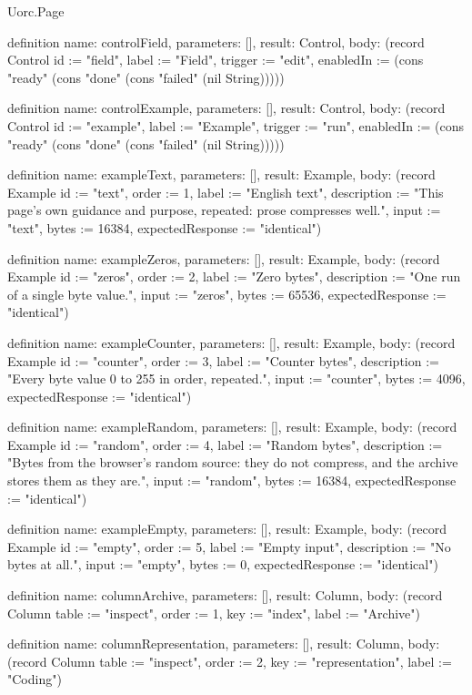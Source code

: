 \begin{lexlean}{Uorc.Page}
\begin{semanticmodule}
definition{
  name: controlField,
  parameters: [],
  result: Control,
  body: (record Control {id := "field", label := "Field", trigger := "edit", enabledIn := (cons "ready" (cons "done" (cons "failed" (nil String))))})
}

definition{
  name: controlExample,
  parameters: [],
  result: Control,
  body: (record Control {id := "example", label := "Example", trigger := "run", enabledIn := (cons "ready" (cons "done" (cons "failed" (nil String))))})
}

definition{
  name: exampleText,
  parameters: [],
  result: Example,
  body: (record Example {id := "text", order := 1, label := "English text", description := "This page's own guidance and purpose, repeated: prose compresses well.", input := "text", bytes := 16384, expectedResponse := "identical"})
}

definition{
  name: exampleZeros,
  parameters: [],
  result: Example,
  body: (record Example {id := "zeros", order := 2, label := "Zero bytes", description := "One run of a single byte value.", input := "zeros", bytes := 65536, expectedResponse := "identical"})
}

definition{
  name: exampleCounter,
  parameters: [],
  result: Example,
  body: (record Example {id := "counter", order := 3, label := "Counter bytes", description := "Every byte value 0 to 255 in order, repeated.", input := "counter", bytes := 4096, expectedResponse := "identical"})
}

definition{
  name: exampleRandom,
  parameters: [],
  result: Example,
  body: (record Example {id := "random", order := 4, label := "Random bytes", description := "Bytes from the browser's random source: they do not compress, and the archive stores them as they are.", input := "random", bytes := 16384, expectedResponse := "identical"})
}

definition{
  name: exampleEmpty,
  parameters: [],
  result: Example,
  body: (record Example {id := "empty", order := 5, label := "Empty input", description := "No bytes at all.", input := "empty", bytes := 0, expectedResponse := "identical"})
}

definition{
  name: columnArchive,
  parameters: [],
  result: Column,
  body: (record Column {table := "inspect", order := 1, key := "index", label := "Archive"})
}

definition{
  name: columnRepresentation,
  parameters: [],
  result: Column,
  body: (record Column {table := "inspect", order := 2, key := "representation", label := "Coding"})
}


\end{semanticmodule}
\end{lexlean}
